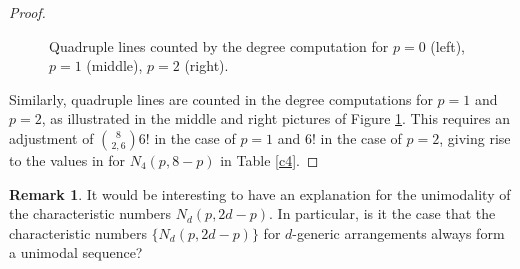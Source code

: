 \documentclass[12pt]{article}
\theoremstyle{plain}
\theoremstyle{definition}
\newtheorem{remark}[theorem]{Remark}
\begin{document}
\begin{proof}
\begin{figure}
\begin{center}
\end{center}
\caption{Quadruple lines counted by the degree computation
for $p=0$ (left), $p=1$ (middle), $p=2$ (right).}
\label{4lines}
\end{figure}

Similarly, quadruple lines are counted in the degree
computations for $p=1$ and $p=2$, as illustrated in the middle and
right pictures of Figure \ref{4lines}. This requires an adjustment of
$\binom{8}{2,6}6!$ in the case of $p=1$ and $6!$ in the case of
$p=2$, giving rise to the values in for $N_4(p,8-p)$ in Table
\ref{c4}. 
\end{proof} 

\begin{remark} It would be interesting to have an explanation for the unimodality of
the characteristic numbers $N_d(p,2d-p)$. In
particular, is it the case that the characteristic numbers
$\{ N_d(p,2d-p)\}$ for
$d$-generic arrangements always form a unimodal sequence? 
\end{remark}
\end{document}
